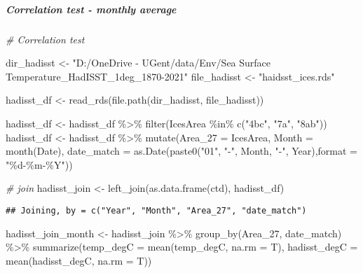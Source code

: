 \documentclass[
]{article}
\newenvironment{Shaded}{\begin{snugshade}}{\end{snugshade}}
\newcommand{\AttributeTok}[1]{\textcolor[rgb]{0.77,0.63,0.00}{#1}}
\newcommand{\CommentTok}[1]{\textcolor[rgb]{0.56,0.35,0.01}{\textit{#1}}}
\newcommand{\FunctionTok}[1]{\textcolor[rgb]{0.00,0.00,0.00}{#1}}
\newcommand{\NormalTok}[1]{#1}
\newcommand{\OtherTok}[1]{\textcolor[rgb]{0.56,0.35,0.01}{#1}}
\newcommand{\SpecialCharTok}[1]{\textcolor[rgb]{0.00,0.00,0.00}{#1}}
\newcommand{\StringTok}[1]{\textcolor[rgb]{0.31,0.60,0.02}{#1}}
\begin{document}
\hypertarget{correlation-test---monthly-average}{%
\subparagraph{Correlation test - monthly
average}\label{correlation-test---monthly-average}}

\begin{Shaded}
\begin{Highlighting}[]
\CommentTok{\# Correlation test}

\NormalTok{dir\_hadisst }\OtherTok{\textless{}{-}} \StringTok{"D:/OneDrive {-} UGent/data/Env/Sea Surface Temperature\_HadISST\_1deg\_1870{-}2021"}
\NormalTok{file\_hadisst }\OtherTok{\textless{}{-}} \StringTok{"haidsst\_ices.rds"}

\NormalTok{hadisst\_df }\OtherTok{\textless{}{-}} \FunctionTok{read\_rds}\NormalTok{(}\FunctionTok{file.path}\NormalTok{(dir\_hadisst, file\_hadisst))}

\NormalTok{hadisst\_df }\OtherTok{\textless{}{-}}\NormalTok{ hadisst\_df }\SpecialCharTok{\%\textgreater{}\%} \FunctionTok{filter}\NormalTok{(IcesArea }\SpecialCharTok{\%in\%} \FunctionTok{c}\NormalTok{(}\StringTok{"4bc"}\NormalTok{, }\StringTok{"7a"}\NormalTok{, }\StringTok{"8ab"}\NormalTok{))}
\NormalTok{hadisst\_df }\OtherTok{\textless{}{-}}\NormalTok{ hadisst\_df }\SpecialCharTok{\%\textgreater{}\%} \FunctionTok{mutate}\NormalTok{(}\AttributeTok{Area\_27 =}\NormalTok{ IcesArea,}
                              \AttributeTok{Month =} \FunctionTok{month}\NormalTok{(Date), }
                              \AttributeTok{date\_match =} \FunctionTok{as.Date}\NormalTok{(}\FunctionTok{paste0}\NormalTok{(}\StringTok{"01"}\NormalTok{, }\StringTok{"{-}"}\NormalTok{, Month, }\StringTok{"{-}"}\NormalTok{, Year),}\AttributeTok{format =} \StringTok{"\%d{-}\%m{-}\%Y"}\NormalTok{))}

\CommentTok{\# join }
\NormalTok{hadisst\_join }\OtherTok{\textless{}{-}} \FunctionTok{left\_join}\NormalTok{(}\FunctionTok{as.data.frame}\NormalTok{(ctd), hadisst\_df)}
\end{Highlighting}
\end{Shaded}

\begin{verbatim}
## Joining, by = c("Year", "Month", "Area_27", "date_match")
\end{verbatim}

\begin{Shaded}
\begin{Highlighting}[]
\NormalTok{hadisst\_join\_month }\OtherTok{\textless{}{-}}\NormalTok{ hadisst\_join }\SpecialCharTok{\%\textgreater{}\%} 
  \FunctionTok{group\_by}\NormalTok{(Area\_27, date\_match) }\SpecialCharTok{\%\textgreater{}\%} 
  \FunctionTok{summarize}\NormalTok{(}\AttributeTok{temp\_degC =} \FunctionTok{mean}\NormalTok{(temp\_degC, }\AttributeTok{na.rm =}\NormalTok{ T),}
            \AttributeTok{hadisst\_degC =} \FunctionTok{mean}\NormalTok{(hadisst\_degC, }\AttributeTok{na.rm =}\NormalTok{ T))}
\end{Highlighting}
\end{Shaded}
\end{document}
